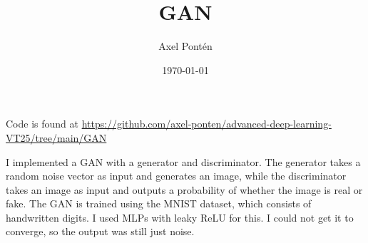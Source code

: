 \documentclass[12pt, a4paper]{article}
\title{GAN}
\author{Axel Pontén}
\date{\today}
\begin{document}
\maketitle

Code is found at \url{https://github.com/axel-ponten/advanced-deep-learning-VT25/tree/main/GAN}

I implemented a GAN with a generator and discriminator. The generator takes a random noise vector as input and generates an image, while the discriminator takes an image as input and outputs a probability of whether the image is real or fake. The GAN is trained using the MNIST dataset, which consists of handwritten digits. I used MLPs with leaky ReLU for this. I could not get it to converge, so the output was still just noise.
\end{document}
